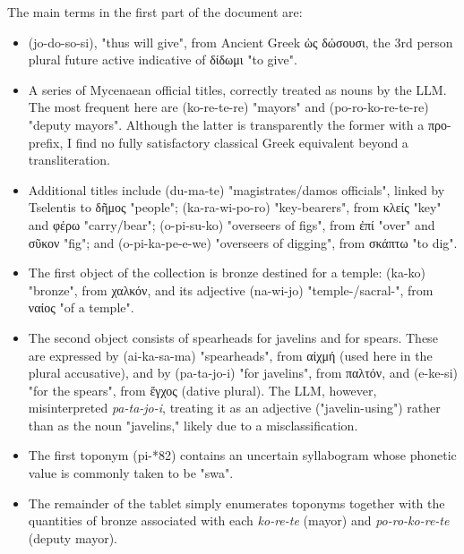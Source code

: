 The main terms in the first part of the document are:
\begin{itemize}
  \item \textlinb{\Bjo\Bdo\Bso\Bi\Bsi} (jo-do-so-si), "thus will give", from Ancient Greek \textgreek{ὡς δώσουσι}, the 3rd person plural future active indicative of \textgreek{δίδωμι} "to give".
  \item A series of Mycenaean official titles, correctly treated as nouns by the LLM. The most frequent here are \textlinb{\Bko\Be\Bre\Bte\Bre} (ko-re-te-re) "mayors" and \textlinb{\Bpo\Bro\Bko\Be\Bre\Bte\Bre} (po-ro-ko-re-te-re) "deputy mayors".
  Although the latter is transparently the former with a \textgreek{προ-} prefix, I find no fully satisfactory classical Greek equivalent beyond a transliteration.
  \item Additional titles include \textlinb{\Bdu\Bma\Bte} (du-ma-te) "magistrates/damos officials", linked by Tselentis to \textgreek{δῆμος} "people"; \textlinb{\Bka\Bra\Bwi\Bpo\Bro} (ka-ra-wi-po-ro) "key-bearers", from \textgreek{κλείς} "key" and \textgreek{φέρω} "carry/bear"; \textlinb{\Bo\Bpi\Bsu\Bko} (o-pi-su-ko) "overseers of figs", from \textgreek{ἐπί} "over" and \textgreek{σῦκον} "fig"; and \textlinb{\Bo\Bpi\Bka\Bpe\Be\Bwe} (o-pi-ka-pe-e-we) "overseers of digging", from \textgreek{σκάπτω} "to dig".
  \item The first object of the collection is bronze destined for a temple: \textlinb{\Bka\Bko} (ka-ko) "bronze", from \textgreek{χαλκόν}, and its adjective \textlinb{\Bna\Bwi\Bjo} (na-wi-jo) "temple-/sacral-", from \textgreek{ναίος} "of a temple".
  \item The second object consists of spearheads for javelins and for spears.
  These are expressed by \textlinb{\Baiii\Bka\Bsa\Bma} (ai-ka-sa-ma) "spearheads", from \textgreek{αἰχμή} (used here in the plural accusative), and by \textlinb{\Bpa\Bta\Bjo\Bi} (pa-ta-jo-i) "for javelins", from \textgreek{παλτόν}, and \textlinb{\Be\Bke\Bsi} (e-ke-si) "for the spears", from \textgreek{ἔγχος} (dative plural).
  The LLM, however, misinterpreted \textit{pa-ta-jo-i}, treating it as an adjective ("javelin-using") rather than as the noun "javelins," likely due to a misclassification.  \item The first toponym \textlinb{\Bpi\Bswa} (pi-*82) contains an uncertain syllabogram whose phonetic value is commonly taken to be "swa".
  \item The remainder of the tablet simply enumerates toponyms together with the quantities of bronze associated with each \textit{ko-re-te} (mayor) and \textit{po-ro-ko-re-te} (deputy mayor).
\end{itemize}

